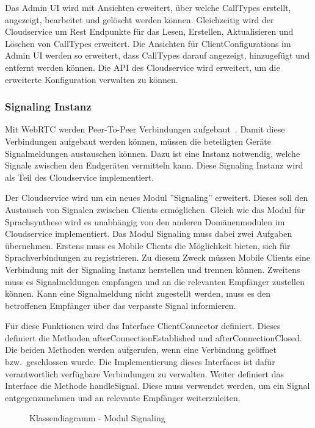 Das Admin UI wird mit Ansichten erweitert, über welche CallTypes erstellt, angezeigt, bearbeitet und gelöscht werden können.
Gleichzeitig wird der Cloudservice um Rest Endpunkte für das Lesen, Erstellen, Aktualisieren und Löschen von CallTypes erweitert.
Die Ansichten für ClientConfigurations im Admin UI werden so erweitert, dass CallTypes darauf angezeigt, hinzugefügt und entfernt werden können.
Die API des Cloudservice wird erweitert, um die erweiterte Konfiguration verwalten zu können.

\clearpage

\subsubsection{Signaling Instanz}

Mit WebRTC werden Peer-To-Peer Verbindungen aufgebaut~\cite{webrtc}.
Damit diese Verbindungen aufgebaut werden können, müssen die beteiligten Geräte Signalmeldungen austauschen können.
Dazu ist eine Instanz notwendig, welche Signale zwischen den Endgeräten vermitteln kann.
Diese Signaling Instanz wird als Teil des Cloudservice implementiert.

Der Cloudservice wird um ein neues Modul ''Signaling'' erweitert.
Dieses soll den Austausch von Signalen zwischen Clients ermöglichen.
Gleich wie das Modul für Sprachsynthese wird es unabhängig von den anderen Domänenmodulen im Cloudservice implementiert.
Das Modul Signaling muss dabei zwei Aufgaben übernehmen.
Erstens muss es Mobile Clients die Möglichkeit bieten, sich für Sprachverbindungen zu registrieren.
Zu diesem Zweck müssen Mobile Clients eine Verbindung mit der Signaling Instanz herstellen und trennen können.
Zweitens muss es Signalmeldungen empfangen und an die relevanten Empfänger zustellen können.
Kann eine Signalmeldung nicht zugestellt werden, muss es den betroffenen Empfänger über das verpasste Signal informieren.

Für diese Funktionen wird das Interface ClientConnector definiert.
Dieses definiert die Methoden afterConnectionEstablished und afterConnectionClosed.
Die beiden Methoden werden aufgerufen, wenn eine Verbindung geöffnet bzw.\ geschlossen wurde.
Die Implementierung dieses Interfaces ist dafür verantwortlich verfügbare Verbindungen zu verwalten.
Weiter definiert das Interface die Methode handleSignal.
Diese muss verwendet werden, um ein Signal entgegenzunehmen und an relevante Empfänger weiterzuleiten.

\begin{figure}[h]
    \centering
    \begin{minipage}[b]{1\textwidth}
        \caption{Klassendiagramm - Modul Signaling}
    \end{minipage}
\end{figure}

